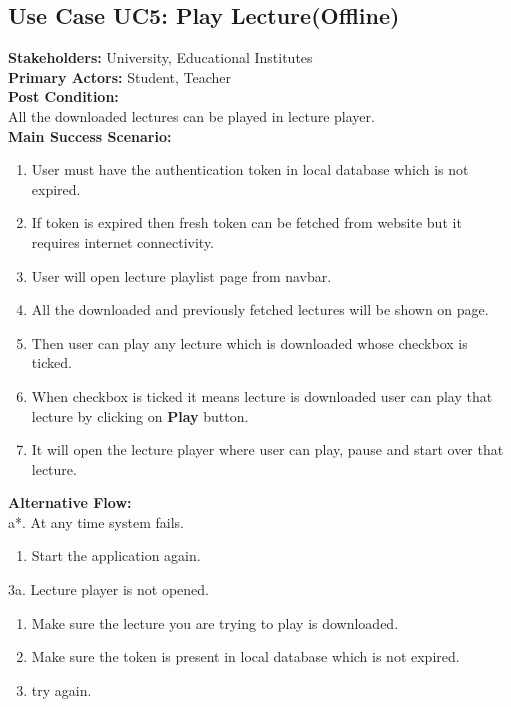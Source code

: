 \subsection{Use Case UC5: Play Lecture(Offline)}
\textbf{Stakeholders: } University, Educational Institutes \\
\textbf{Primary Actors: } Student, Teacher \\
\textbf{Post Condition: }\\
All the downloaded lectures can be played in lecture player.\\
\textbf{Main Success Scenario: }
\begin{enumerate}
\item User must have the authentication token in local database which is not expired.
\item If token is expired then fresh token can be fetched from website but it requires internet connectivity.
\item User will open lecture playlist page from navbar.
\item All the downloaded and previously fetched lectures will be shown on page.
\item Then user can play any lecture which is downloaded whose checkbox is ticked.
\item When checkbox is ticked it means lecture is downloaded user can play that lecture by clicking on \textbf{Play} button.
\item It will open the lecture player where user can play, pause and start over that lecture.

\end{enumerate}
\textbf{Alternative Flow: }\\
a*. At any time system fails.
\begin{enumerate}
\item Start the application again.
\end{enumerate}
3a. Lecture player is not opened.
\begin{enumerate}
\item Make sure the lecture you are trying to play is downloaded.
\item Make sure the token is present in local database which is not expired.
\item try again.
\end{enumerate}
